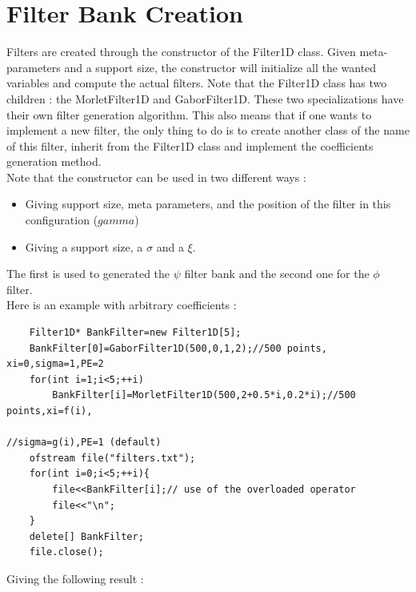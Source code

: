 \documentclass[a4paper]{report}
\begin{document}
\section{Filter Bank Creation}
Filters are created through the constructor of the Filter1D class. Given meta-parameters and a support size, the constructor will initialize all the wanted variables and compute the actual filters. Note that the Filter1D class has two children : the MorletFilter1D and GaborFilter1D. These two specializations have their own filter generation algorithm. This also means that if one wants to implement a new filter, the only thing to do is to create another class of the name of this filter, inherit from the Filter1D class and implement the coefficients generation method.
\\Note that the constructor can be used in two different ways :
\begin{itemize}
\item Giving support size, meta parameters, and the position of the filter in this configuration ($gamma$)
\item Giving a support size, a $\sigma$ and a $\xi$.
\end{itemize}
The first is used to generated the $\psi$ filter bank and the second one for the $\phi$ filter.
\\
Here is an example with arbitrary coefficients :
\begin{lstlisting}
    Filter1D* BankFilter=new Filter1D[5];
    BankFilter[0]=GaborFilter1D(500,0,1,2);//500 points, xi=0,sigma=1,PE=2
    for(int i=1;i<5;++i)
        BankFilter[i]=MorletFilter1D(500,2+0.5*i,0.2*i);//500 points,xi=f(i),
                                                        //sigma=g(i),PE=1 (default)
    ofstream file("filters.txt");
    for(int i=0;i<5;++i){
        file<<BankFilter[i];// use of the overloaded operator
        file<<"\n";
    }
    delete[] BankFilter;
    file.close();

\end{lstlisting}
Giving the following result :
\end{document}
